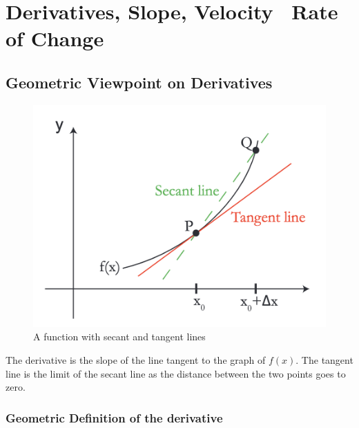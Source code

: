 

\chapter{Derivatives, Slope, Velocity \ Rate of Change}  

\bigbreak
\section{Geometric Viewpoint on Derivatives}

\begin{figure}[ht!]
	\centering
	\includegraphics[scale=0.3]{./images/lecture_1_figure_1.png}
	\caption{A function with secant and tangent lines}
\end{figure}

The derivative is the slope of the line tangent to the graph of $f(x)$.
The tangent line is the limit of the secant line as the distance between the two points goes to zero.

\subsection{Geometric Definition of the derivative}

